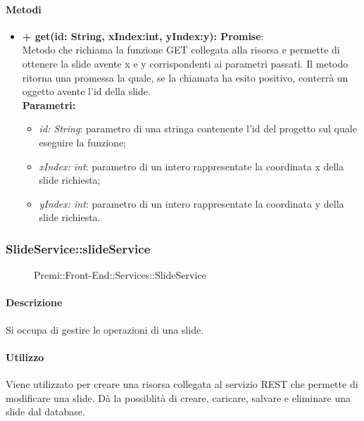		\paragraph{Metodi}
		\begin{itemize}
			\item \textbf{+ get(id: String, xIndex:int, yIndex:y): Promise}:\\
			Metodo che richiama la funzione GET collegata alla risorsa e permette di ottenere la slide avente x e y corrispondenti ai parametri passati. Il metodo ritorna una promessa la quale, se la chiamata ha esito positivo, conterrà un oggetto avente l'id della slide.\\
			\textbf{Parametri:}\\
			\begin{itemize}
				\item \textit{id: String}: parametro di una stringa contenente l'id del progetto sul quale eseguire la funzione;
				\item \textit{xIndex: int}: parametro di un intero rappresentate la coordinata x della slide richiesta;
				\item \textit{yIndex: int}: parametro di un intero rappresentate la coordinata y della slide richiesta.
			\end{itemize}
		\end{itemize}
		
		
		\subsubsection{SlideService::slideService}
		\begin{figure}[h]
			\centering
			\caption[Premi::Front-End::Services::SlideService]{Premi::Front-End::Services::SlideService}
		\end{figure}
		
		\paragraph{Descrizione}
		Si occupa di gestire le operazioni di una slide.
		
		\paragraph{Utilizzo}
		Viene utilizzato per creare una risorsa collegata al servizio REST che permette di modificare una slide. Dà la possiblità di creare, caricare, salvare e eliminare una slide dal database.
		
